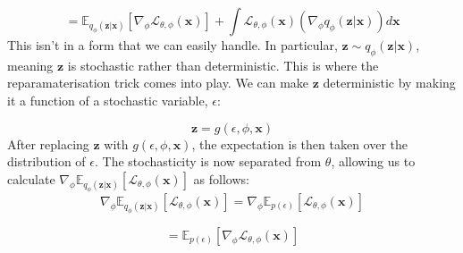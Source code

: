 \documentclass[]{article}
\begin{document}
\begin{equation}
= \mathbb{E}_{q_{\phi}(\mathbf{z}|\mathbf{x})}[\nabla_{\phi} \mathcal{L}_{\theta, \phi}(\mathbf{x})] + \int \mathcal{L}_{\theta, \phi}(\mathbf{x}) (\nabla_{\phi} q_{\phi}(\mathbf{z}|\mathbf{x})) d\mathbf{x}
\end{equation}
This isn't in a form that we can easily handle. In particular, $\mathbf{z} \sim q_{\phi}(\mathbf{z}|\mathbf{x})$, meaning $\mathbf{z}$ is stochastic rather than deterministic. This is where the reparamaterisation trick comes into play. We can make $\mathbf{z}$ deterministic by making it a function of a stochastic variable, $\epsilon$:

\begin{equation}
\mathbf{z} = g(\epsilon, \phi, \mathbf{x})
\end{equation}
After replacing $\mathbf{z}$ with $g(\epsilon, \phi, \mathbf{x})$, the expectation is then taken over the distribution of $\epsilon$. The stochasticity is now separated from $\theta$, allowing us to calculate $ \nabla_{\phi}\mathbb{E}_{q_{\phi}(\mathbf{z}|\mathbf{x})}[\mathcal{L}_{\theta, \phi}(\mathbf{x})]
$ as follows:
\begin{equation}
\nabla_{\phi}\mathbb{E}_{q_{\phi}(\mathbf{z}|\mathbf{x})}[\mathcal{L}_{\theta, \phi}(\mathbf{x})] = \nabla_{\phi}\mathbb{E}_{p(\epsilon)}[\mathcal{L}_{\theta, \phi}(\mathbf{x})]
\end{equation}

\begin{equation}
= \mathbb{E}_{p(\epsilon)}[\nabla_{\phi}\mathcal{L}_{\theta, \phi}(\mathbf{x})]
\end{equation}

\nocite{*}


\end{document}
